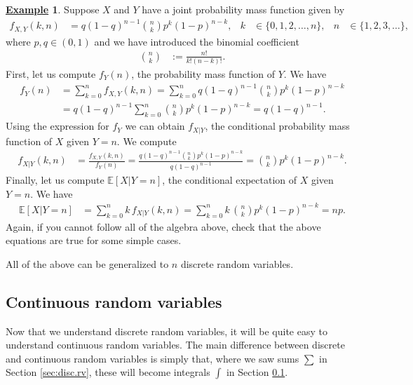 \documentclass[12pt]{book}
\numberwithin{equation}{chapter}
\theoremstyle{plain}
\numberwithin{theorem}{section}
\theoremstyle{definition}
\newtheorem{example}[theorem]{\underline{Example}}
\numberwithin{exercise}{chapter}
\newcommand{\<}{\langle}
\renewcommand{\>}{\rangle}
\renewcommand{\(}{\left(}
\renewcommand{\)}{\right)}
\renewcommand{\[}{\left[}
\renewcommand{\]}{\right]}
\newcommand\Eb{\mathds{E}}
\theoremstyle{definition}
\numberwithin{question}{section}
\begin{document}
\begin{example}
Suppose $X$ and $Y$ have a joint probability mass function given by
\begin{align}
f_{X,Y}(k,n)
	&=	q (1-q)^{n-1} \binom{n}{k} p^k (1-p)^{n-k} , &
k
	&\in \{ 0, 1, 2, \ldots, n \} , &
n
	&\in \{ 1, 2, 3, \ldots \} ,
\end{align}
where $p,q \in (0,1)$ and we have introduced the binomial coefficient
\begin{align}
\binom{n}{k}
	&:=	\frac{n!}{k!(n-k)!} .
\end{align}
First, let us compute $f_Y(n)$, the probability mass function of $Y$.  We have
\begin{align}
f_Y(n)
	&=	\sum_{k=0}^n f_{X,Y}(k,n)
	=		\sum_{k=0}^n q (1-q)^{n-1} \binom{n}{k} p^k (1-p)^{n-k} \\
	&=	q (1-q)^{n-1}  \sum_{k=0}^n \binom{n}{k} p^k (1-p)^{n-k}
	=   q (1-q)^{n-1} .
\end{align}
Using the expression for $f_Y$ we can obtain $f_{X|Y}$, the conditional probability mass function of $X$ given $Y = n$.  We compute
\begin{align}
f_{X|Y}(k,n)
	&=	\frac{ f_{X,Y}(k,n) }{ f_Y(n)}
	=		\frac{ q (1-q)^{n-1} \binom{n}{k} p^k (1-p)^{n-k} }{q (1-q)^{n-1}}
	=		 \binom{n}{k} p^k (1-p)^{n-k} .
\end{align}
Finally, let us compute $\Eb[ X | Y = n ]$, the conditional expectation of $X$ given $Y = n$.  We have
\begin{align}
\Eb[ X | Y = n ]
	&=	\sum_{k=0}^n k \, f_{X|Y}(k,n) 
	=		\sum_{k=0}^n k \, \binom{n}{k} p^k (1-p)^{n-k}
	=		n p .
\end{align}
Again, if you cannot follow all of the algebra above, check that the above equations are true for some simple cases.
\end{example}

\noindent
All of the above can be generalized to $n$ discrete random variables.


\subsection{Continuous random variables}
\label{sec:cont.rv}

\noindent
Now that we understand discrete random variables, it will be quite easy to understand continuous random variables.  The main difference between discrete and continuous random variables is simply that, where we saw sums $\sum$ in Section \ref{sec:disc.rv}, these will become integrals $\int$ in Section \ref{sec:cont.rv}.
\end{document}
